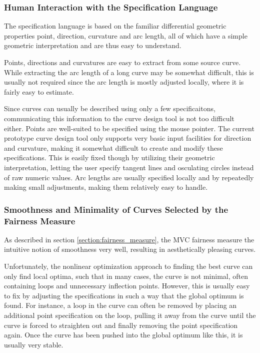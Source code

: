 \documentclass[a4paper]{article}
\begin{document}
			\subsubsection{Human Interaction with the Specification Language}
			\label{section:human_interaction_specification_language}

				The specification language is based on the familiar differential geometric properties point, direction, curvature and arc length, all of which have a simple geometric interpretation and are thus easy to understand.

				Points, directions and curvatures are easy to extract from some source curve. While extracting the arc length of a long curve may be somewhat difficult, this is usually not required since the arc length is mostly adjusted locally, where it is fairly easy to estimate.

				Since curves can usually be described using only a few specificaitons, communicating this information to the curve design tool is not too difficult either. Points are well-suited to be specified using the mouse pointer. The current prototype curve design tool only supports very basic input facilities for direction and curvature, making it somewhat difficult to create and modify these specifications. This is easily fixed though by utilizing their geometric interpretation, letting the user specify tangent lines and osculating circles instead of raw numeric values. Arc lengths are usually specified locally and by repeatedly making small adjustments, making them relatively easy to handle.

			\subsubsection{Smoothness and Minimality of Curves Selected by the Fairness Measure}
			\label{section:smoothness_minimality_curves_selected_fairness_measure}

				As described in section \ref{section:fairness_measure}, the MVC fairness measure the intuitive notion of smoothness very well, resulting in aesthetically pleasing curves.

				Unfortunately, the nonlinear optimization approach to finding the best curve can only find local optima, such that in many cases, the curve is not minimal, often containing loops and unnecessary inflection points. However, this is usually easy to fix by adjusting the specifications in such a way that the global optimum is found. For instance, a loop in the curve can often be removed by placing an additional point specification on the loop, pulling it away from the curve until the curve is forced to straighten out and finally removing the point specification again. Once the curve has been pushed into the global optimum like this, it is usually very stable.
\end{document}
